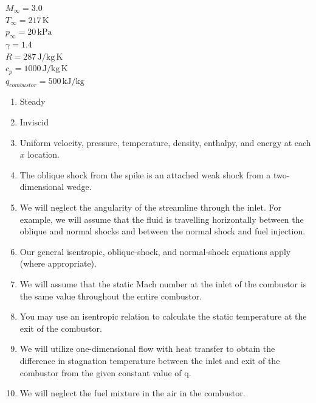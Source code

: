 \documentclass[../main.tex]{subfiles}
\begin{document}

\givens{}
\(M_\infty = 3.0\)\\
\(T_\infty = 217 \,\unit{\kelvin}\)\\
\(p_\infty = 20 \,\unit{\kilo\pascal}\)\\
\(\gamma=1.4\)\\
\(R = 287\,\unit{\joule/\kilogram\,\kelvin}\)\\
\(c_p = 1000 \, \unit{\joule/\kilogram\,\kelvin}\)\\
\(q_{combustor} = 500 \, \unit{\kilo\joule/\kilogram}\)

\assumptions{}

\begin{enumerate}[label=(\roman*)]
    \item Steady \label{steady}
    \item Inviscid \label{inviscid}
    \item Uniform velocity, pressure, temperature, density, enthalpy, and energy at each \(x\) location. \label{uniform}
    \item The oblique shock from the spike is an attached weak shock from a two-dimensional wedge. \label{oblique}
    \item We will neglect the angularity of the streamline through the inlet. 
        For example, we will assume that the fluid is travelling horizontally between the oblique and normal shocks and between the normal shock and fuel injection. \label{angularity}
    \item Our general isentropic, oblique-shock, and normal-shock equations apply (where appropriate). \label{general}
    \item We will assume that the static Mach number at the inlet of the combustor is the same value throughout the entire combustor.
        \label{constant_mach}
    \item You may use an isentropic relation to calculate the static temperature at the exit of the combustor. \label{combustortemp}
    \item We will utilize one-dimensional flow with heat transfer to obtain the difference in stagnation temperature between the inlet and exit of the combustor from the given constant value of q. \label{combustion}
    \item We will neglect the fuel mixture in the air in the combustor. \label{fuel}
    
\end{enumerate}

\end{document}
